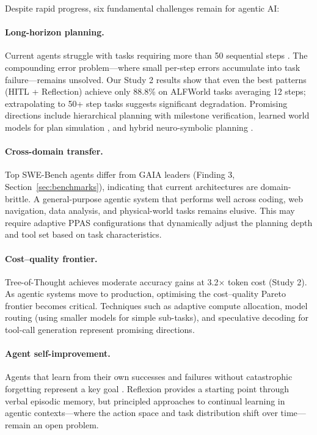 \documentclass[review,authoryear]{elsarticle}
\theoremstyle{definition}
\begin{document}
Despite rapid progress, six fundamental challenges remain for agentic AI:

\paragraph{Long-horizon planning.} Current agents struggle with tasks requiring more than 50 sequential steps \citep{valmeekam2024planning,kinniment2024evaluating}. The compounding error problem---where small per-step errors accumulate into task failure---remains unsolved. Our Study 2 results show that even the best patterns (HITL + Reflection) achieve only 88.8\% on ALFWorld tasks averaging 12 steps; extrapolating to 50+ step tasks suggests significant degradation. Promising directions include hierarchical planning with milestone verification, learned world models for plan simulation \citep{hao2023reasoning}, and hybrid neuro-symbolic planning \citep{ghallab2004automated}.

\paragraph{Cross-domain transfer.} Top SWE-Bench agents differ from GAIA leaders (Finding 3, Section~\ref{sec:benchmarks}), indicating that current architectures are domain-brittle. A general-purpose agentic system that performs well across coding, web navigation, data analysis, and physical-world tasks remains elusive. This may require adaptive PPAS configurations that dynamically adjust the planning depth and tool set based on task characteristics.

\paragraph{Cost--quality frontier.} Tree-of-Thought achieves moderate accuracy gains at 3.2$\times$ token cost (Study 2). As agentic systems move to production, optimising the cost--quality Pareto frontier becomes critical. Techniques such as adaptive compute allocation, model routing (using smaller models for simple sub-tasks), and speculative decoding for tool-call generation represent promising directions.

\paragraph{Agent self-improvement.} Agents that learn from their own successes and failures without catastrophic forgetting represent a key goal \citep{christiano2017deep}. Reflexion \citep{shinn2023reflexion} provides a starting point through verbal episodic memory, but principled approaches to continual learning in agentic contexts---where the action space and task distribution shift over time---remain an open problem.
\end{document}
